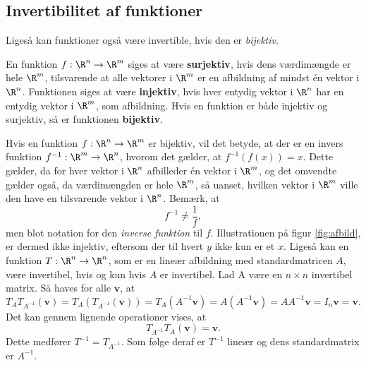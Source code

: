 %
%
\subsection{Invertibilitet af funktioner}
%
% 
Ligeså kan funktioner også være invertible, hvis den er \textit{bijektiv}.
%
\begin{defn}{}{}
En funktion $f:\R^n \rightarrow \R^m$ siges at være \textbf{surjektiv}, hvis dens værdimængde er hele $\R^m$, tilsvarende at alle vektorer i $\R^m$ er en afbildning af mindst én vektor i $\R^n$.
Funktionen siges at være \textbf{injektiv}, hvis hver entydig vektor i $\R^n$ har en entydig vektor i $\R^m$, som afbildning.
Hvis en funktion er både injektiv og surjektiv, så er funktionen \textbf{bijektiv}.
\end{defn}
\noindent
%
Hvis en funktion $f:\R^n \rightarrow \R^m$ er bijektiv, vil det betyde, at der er en invers funktion $f^{-1}:\R^m \rightarrow \R^n$, hvorom det gælder, at $f^{-1}(f(x))=x$.
Dette gælder, da for hver vektor i $\R^n$ afbilleder én vektor i $\R^m$, og det omvendte gælder også, da værdimængden er hele $\R^m$, så uanset, hvilken vektor i $\R^m$ ville den have en tilsvarende vektor i $\R^n$.
Bemærk, at
$$f^{-1} \neq \frac{1}{f},$$
men blot notation for den \textit{inverse funktion} til $f$.
%
Illustrationen på figur \ref{fig:afbild}, er dermed ikke injektiv, eftersom der til hvert $y$ ikke kun er et $x$. 
%
Ligeså kan en funktion $T:\R^n \rightarrow \R^n$, som er en lineær afbildning med standardmatricen $A$, være invertibel, hvis og kun hvis $A$ er invertibel. 
Lad A være en $n \times n$ invertibel matrix. 
Så haves for alle $\textbf{v}$, at
$$T_AT_{A^{-1}}(\textbf{v})=T_A(T_{A^{-1}}(\textbf{v}))=T_A(A^{-1}\textbf{v})=A(A^{-1}\textbf{v})=AA^{-1}\textbf{v}=I_n\textbf{v}=\textbf{v}.$$
Det kan gennem lignende operationer vises, at
$$T_{A^{-1}}T_A(\textbf{v})=\textbf{v}.$$
%
Dette medfører $T^{-1}=T_{A^{-1}}$. 
Som følge deraf er $T^{-1}$ lineær og dens standardmatrix er $A^{-1}$.
\\
%

